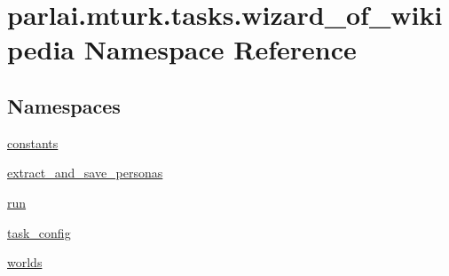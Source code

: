 \hypertarget{namespaceparlai_1_1mturk_1_1tasks_1_1wizard__of__wikipedia}{}\section{parlai.\+mturk.\+tasks.\+wizard\+\_\+of\+\_\+wikipedia Namespace Reference}
\label{namespaceparlai_1_1mturk_1_1tasks_1_1wizard__of__wikipedia}
\subsection*{Namespaces}
\begin{DoxyCompactItemize}
\item 
 \hyperlink{namespaceparlai_1_1mturk_1_1tasks_1_1wizard__of__wikipedia_1_1constants}{constants}
\item 
 \hyperlink{namespaceparlai_1_1mturk_1_1tasks_1_1wizard__of__wikipedia_1_1extract__and__save__personas}{extract\+\_\+and\+\_\+save\+\_\+personas}
\item 
 \hyperlink{namespaceparlai_1_1mturk_1_1tasks_1_1wizard__of__wikipedia_1_1run}{run}
\item 
 \hyperlink{namespaceparlai_1_1mturk_1_1tasks_1_1wizard__of__wikipedia_1_1task__config}{task\+\_\+config}
\item 
 \hyperlink{namespaceparlai_1_1mturk_1_1tasks_1_1wizard__of__wikipedia_1_1worlds}{worlds}
\end{DoxyCompactItemize}

